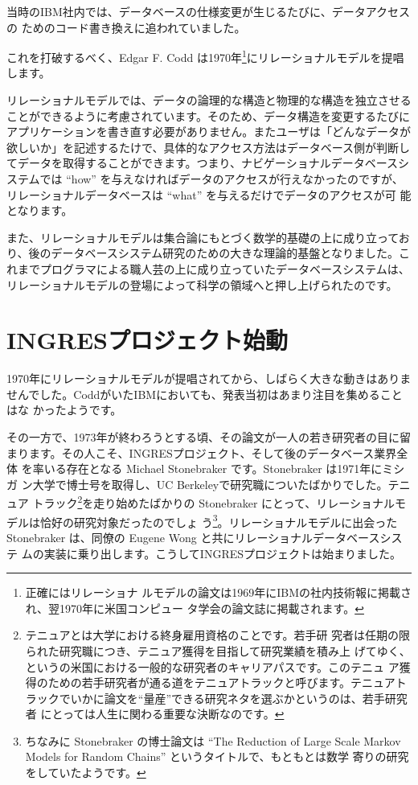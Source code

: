 当時のIBM社内では、データベースの仕様変更が生じるたびに、データアクセスの
ためのコード書き換えに追われていました。


これを打破するべく、Edgar F. Codd は1970年\footnote{正確にはリレーショナ
ルモデルの論文は1969年にIBMの社内技術報に掲載され、翌1970年に米国コンピュー
タ学会の論文誌に掲載されます。}にリレーショナルモデルを提唱します。


リレーショナルモデルでは、データの論理的な構造と物理的な構造を独立させる
ことができるように考慮されています。そのため、データ構造を変更するたびに
アプリケーションを書き直す必要がありません。またユーザは「どんなデータが
欲しいか」を記述するたけで、具体的なアクセス方法はデータベース側が判断し
てデータを取得することができます。つまり、ナビゲーショナルデータベースシ
ステムでは ``how'' を与えなければデータのアクセスが行えなかったのですが、
リレーショナルデータベースは ``what'' を与えるだけでデータのアクセスが可
能となります。


また、リレーショナルモデルは集合論にもとづく数学的基礎の上に成り立ってお
り、後のデータベースシステム研究のための大きな理論的基盤となりました。こ
れまでプログラマによる職人芸の上に成り立っていたデータベースシステムは、
リレーショナルモデルの登場によって科学の領域へと押し上げられたのです。


\section{INGRESプロジェクト始動}


1970年にリレーショナルモデルが提唱されてから、しばらく大きな動きはありま
せんでした。CoddがいたIBMにおいても、発表当初はあまり注目を集めることはな
かったようです。

その一方で、1973年が終わろうとする頃、その論文が一人の若き研究者の目に留
まります。その人こそ、INGRESプロジェクト、そして後のデータベース業界全体
を率いる存在となる Michael Stonebraker です。Stonebraker は1971年にミシガ
ン大学で博士号を取得し、UC Berkeleyで研究職についたばかりでした。テニュア
トラック\footnote{テニュアとは大学における終身雇用資格のことです。若手研
究者は任期の限られた研究職につき、テニュア獲得を目指して研究業績を積み上
げてゆく、というの米国における一般的な研究者のキャリアパスです。このテニュ
ア獲得のための若手研究者が通る道をテニュアトラックと呼びます。テニュアト
ラックでいかに論文を``量産''できる研究ネタを選ぶかというのは、若手研究者
にとっては人生に関わる重要な決断なのです。}を走り始めたばかりの
Stonebraker にとって、リレーショナルモデルは恰好の研究対象だったのでしょ
う\footnote{ちなみに Stonebraker の博士論文は ``The Reduction of Large
Scale Markov Models for Random Chains'' というタイトルで、もともとは数学
寄りの研究をしていたようです。 }。リレーショナルモデルに出会った
Stonebraker は、同僚の Eugene Wong と共にリレーショナルデータベースシステ
ムの実装に乗り出します。こうしてINGRESプロジェクトは始まりました。


